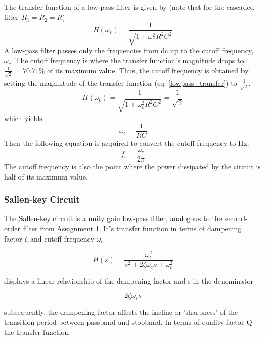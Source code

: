 \documentclass{scrartcl}
\begin{document}
The transfer function of a low-pass filter is given by (note that for the cascaded filter $R_1 = R_2 = R$)
\begin{equation}
\label{lowpass_transfer}
    H(\omega_c) = \frac{1}{\sqrt{1+\omega_c^2R^2C^2}}
\end{equation}
A low-pass filter passes only the frequencies from dc up to the cutoff frequency, $\omega_c$. The cutoff frequency is where the transfer function's magnitude drops to $\frac{1}{\sqrt{2}} = 70.71\%$ of its maximum value. Thus, the cutoff frequency is obtained by setting the magnintude of the transfer function (eq. \ref{lowpass_transfer}) to $\frac{1}{\sqrt{2}}$.
\begin{equation*}
    H(\omega_c) = \frac{1}{\sqrt{1+\omega_c^2R^2C^2}} = \frac{1}{\sqrt{2}}
\end{equation*}
which yields
\begin{equation}
    \omega_c=\frac{1}{RC}
\end{equation}
Then the following equation is acquired to convert the cutoff frequency to Hz.
\begin{equation}
    f_c=\frac{\omega_c}{2\pi}
\end{equation}
The cutoff frequency is also the point where the power dissipated by the circuit is half of its maximum value.




\subsubsection{Sallen-key Circuit} %

The Sallen-key circuit is a unity gain low-pass filter, analogous to the second-order filter from Assignment 1. It's transfer function in terms of dampening factor $\zeta$ and cutoff frequency $\omega_c$

\begin{equation}
    H(s) = \frac{\omega_c^2}{s^2+2\zeta\omega_cs+\omega_c^2}
\end{equation}

displays a linear relationship of the dampening factor and s in the denominator

\begin{equation}
    2\zeta\omega_cs
\end{equation}

subsequently, the dampening factor affects the incline or 'sharpness' of the transition period between passband and stopband. In terms of quality factor Q the transfer function 
\end{document}
